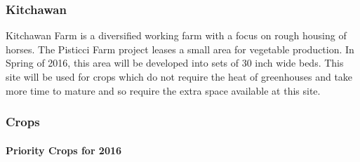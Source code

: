\subsubsection{Kitchawan}\label{kitchawan}

Kitchawan Farm is a diversified working farm with a focus on rough
housing of horses. The Pisticci Farm project leases a small area for
vegetable production. In Spring of 2016, this area will be developed
into sets of 30 inch wide beds. This site will be used for crops which
do not require the heat of greenhouses and take more time to mature and
so require the extra space available at this site.

\subsubsection{Crops}\label{crops}

\paragraph{Priority Crops for 2016}\label{priority-crops-for-2016}

